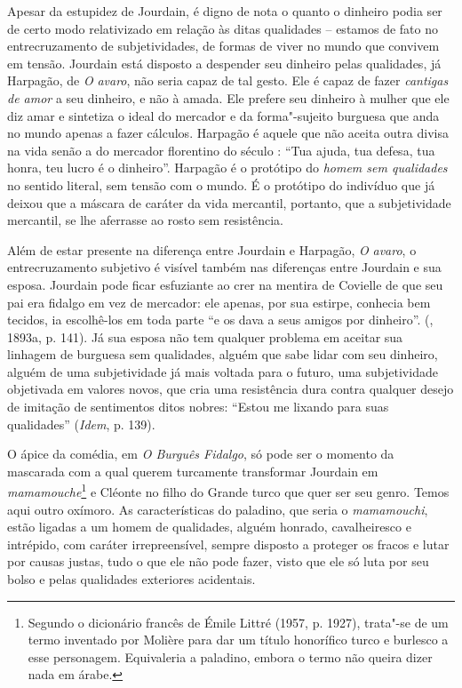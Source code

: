 Apesar da estupidez de Jourdain, é digno de nota o quanto o dinheiro
podia ser de certo modo relativizado em relação às ditas qualidades --
estamos de fato no entrecruzamento de subjetividades, de formas de viver
no mundo que convivem em tensão. Jourdain está disposto a despender seu
dinheiro pelas qualidades, já Harpagão, de \emph{O} \emph{avaro}, não
seria capaz de tal gesto. Ele é capaz de fazer \emph{cantigas de amor} a
seu dinheiro, e não à amada. Ele prefere seu dinheiro à mulher que ele
diz amar e sintetiza o ideal do mercador e da forma"-sujeito burguesa que
anda no mundo apenas a fazer cálculos. Harpagão é aquele que não aceita
outra divisa na vida senão a do mercador florentino do século : ``Tua
ajuda, tua defesa, tua honra, teu lucro é o dinheiro''. Harpagão é o
protótipo do \emph{homem sem qualidades} no sentido literal, sem tensão
com o mundo. É o protótipo do indivíduo que já deixou que a máscara de
caráter da vida mercantil, portanto, que a subjetividade mercantil, se
lhe aferrasse ao rosto sem resistência.

Além de estar presente na diferença entre Jourdain e Harpagão, \emph{O} \emph{avaro}, o
entrecruzamento subjetivo é visível também nas diferenças entre Jourdain
e sua esposa. Jourdain pode ficar esfuziante ao crer na mentira de
Covielle de que seu pai era fidalgo em vez de mercador: ele apenas, por
sua estirpe, conhecia bem tecidos, ia escolhê-los em toda parte ``e os
dava a seus amigos por dinheiro''. (, 1893a, p. 141). Já sua
esposa não tem qualquer problema em aceitar sua linhagem de burguesa sem
qualidades, alguém que sabe lidar com seu dinheiro, alguém de uma
subjetividade já mais voltada para o futuro, uma subjetividade
objetivada em valores novos, que cria uma resistência dura contra
qualquer desejo de imitação de sentimentos ditos nobres: ``Estou me
lixando para suas qualidades'' (\emph{Idem}, p. 139).

O ápice da comédia, em \emph{O Burguês Fidalgo}, só pode ser o momento
da mascarada com a qual querem turcamente transformar Jourdain em
\emph{mamamouche}\footnote{Segundo o dicionário francês de Émile Littré
  (1957, p. 1927), trata"-se de um termo inventado por Molière para dar
  um título honorífico turco e burlesco a esse personagem. Equivaleria a
  paladino, embora o termo não queira dizer nada em árabe.} e Cléonte no
filho do Grande turco que quer ser seu genro. Temos aqui outro oxímoro.
As características do paladino, que seria o \emph{mamamouchi}, estão
ligadas a um homem de qualidades, alguém honrado, cavalheiresco e
intrépido, com caráter irrepreensível, sempre disposto a proteger os
fracos e lutar por causas justas, tudo o que ele não pode fazer, visto
que ele só luta por seu bolso e pelas qualidades exteriores acidentais.

